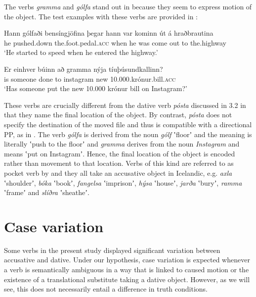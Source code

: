 \documentclass[output=paper,modfonts,nonflat]{langsci/langscibook}
\begin{document}
The verbs \textit{gramma} and \textit{gólfa} stand out in  because they seem to express motion of the object. The test examples with these verbs are provided in :


 
\ea%
    \label{ex:jonsson:6}
    \ea
\gll  Hann  gólfaði  bensíngjöfina  þegar  hann  var  kominn  út  á  hraðbrautina\\
   he  pushed.down  the.foot.pedal.\textsc{acc}  when  he  was  come  out  to  the.highway\\
   \glt `He started to speed when he entered the highway.' 

\ex
\gll   Er  einhver  búinn  að  gramma  nýja  tíuþúsundkallinn?\\
 is  someone  done  to  instagram  new  10.000.krónur.bill.\textsc{acc}\\
\glt `Has someone put the new 10.000 krónur bill on Instagram?'
\z
\z


These verbs are crucially different from the dative verb \textit{pósta}  discussed in 3.2 in that they name the final location of the object. By contrast, \textit{pósta} does not specify the destination of the moved file and thus is compatible with a directional PP, as in . The verb \textit{gólfa} is derived from the noun \textit{gólf} ʽfloorʼ and the meaning is literally ʽpush to the floorʼ and \textit{gramma} derives from the noun \textit{Instagram} and means ʽput on Instagramʼ. Hence, the final location of the object is encoded rather than movement to that location. Verbs of this kind are referred to as pocket verb by \citet{Levin1993} and they all take an accusative object in Icelandic, e.g. \textit{axla} ʽshoulderʼ, \textit{bóka} ʽbookʼ, \textit{fangelsa} ʽimprisonʼ, \textit{hýsa} ʽhouseʼ, \textit{jarða} ʽburyʼ, \textit{ramma} ʽframeʼ and \textit{slíðra} ʽsheatheʼ. 

\section{Case variation}  %

Some verbs in the present study displayed significant variation between accusative and dative. Under our hypothesis, case variation is expected whenever a verb is semantically ambiguous in a way that is linked to caused motion or the existence of a translational substitute taking a dative object. However, as we will see, this does not necessarily entail a difference in truth conditions.
\end{document}
